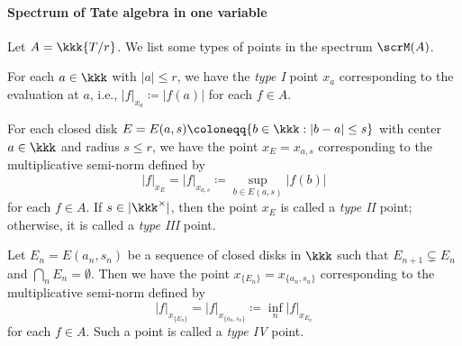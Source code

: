 \paragraph{Spectrum of Tate algebra in one variable}
Let \(A = \kkk\{T/r\}\).
We list some types of points in the spectrum \(\scrM(A)\).

\begin{construction}\label{cons:four_types_of_points_in_spectrum_of_Tate_algebra_in_one_variable}
	For each \(a \in \kkk\) with \(|a| \leq r\), we have the \emph{type I} point \(x_a\) corresponding to the evaluation at \(a\), i.e., \(|f|_{x_a} \coloneqq |f(a)|\) for each \(f \in A\).

	For each closed disk \(E = E(a,s) \coloneqq \{b \in \kkk : |b - a| \leq s\}\) with center \(a \in \kkk\) and radius \(s \leq r\), we have the point \(x_E = x_{a,s}\) corresponding to the multiplicative semi-norm defined by
	\[ |f|_{x_E} = |f|_{x_{a,s}} \coloneqq \sup_{b \in E(a,s)} |f(b)| \]
	for each \(f \in A\).
	If \(s \in |\kkk^\times|\), then the point \(x_E\) is called a \emph{type II} point; otherwise, it is called a \emph{type III} point.

	Let \(E_n = E(a_n,s_n)\) be a sequence of closed disks in \(\kkk\) such that \(E_{n+1} \subsetneq E_n\) and \(\bigcap_n E_n = \emptyset\).
	Then we have the point \(x_{\{E_n\}} = x_{\{a_n,s_n\}}\) corresponding to the multiplicative semi-norm defined by
	\[ |f|_{x_{\{E_n\}}} = |f|_{x_{\{a_n,s_n\}}} \coloneqq \inf_n |f|_{x_{E_n}} \]
	for each \(f \in A\).
	Such a point is called a \emph{type IV} point.
\end{construction}

